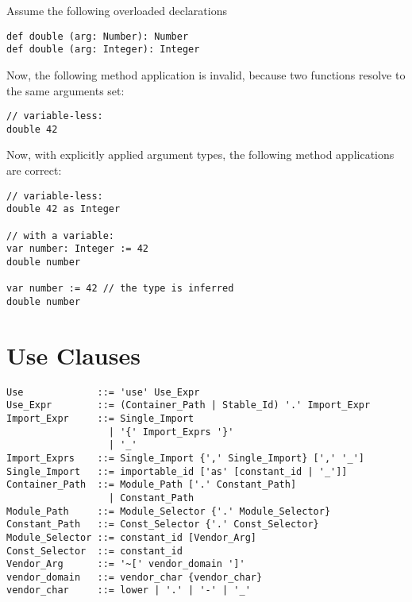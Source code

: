 \example Assume the following overloaded declarations
\begin{lstlisting}
def double (arg: Number): Number
def double (arg: Integer): Integer
\end{lstlisting}
Now, the following method application is invalid, because two functions resolve to the same arguments set: 
\begin{lstlisting}
// variable-less:
double 42
\end{lstlisting}
Now, with explicitly applied argument types, the following method applications are correct:
\begin{lstlisting}
// variable-less:
double 42 as Integer

// with a variable:
var number: Integer := 42
double number

var number := 42 // the type is inferred
double number
\end{lstlisting}

\section{Use Clauses}
\label{sec:use-clauses}

\syntax\begin{lstlisting}
Use             ::= 'use' Use_Expr
Use_Expr        ::= (Container_Path | Stable_Id) '.' Import_Expr
Import_Expr     ::= Single_Import
                  | '{' Import_Exprs '}'
                  | '_'
Import_Exprs    ::= Single_Import {',' Single_Import} [',' '_']
Single_Import   ::= importable_id ['as' [constant_id | '_']]
Container_Path  ::= Module_Path ['.' Constant_Path]
                  | Constant_Path
Module_Path     ::= Module_Selector {'.' Module_Selector}
Constant_Path   ::= Const_Selector {'.' Const_Selector}
Module_Selector ::= constant_id [Vendor_Arg]
Const_Selector  ::= constant_id
Vendor_Arg      ::= '~[' vendor_domain ']'
vendor_domain   ::= vendor_char {vendor_char}
vendor_char     ::= lower | '.' | '-' | '_'
\end{lstlisting}

